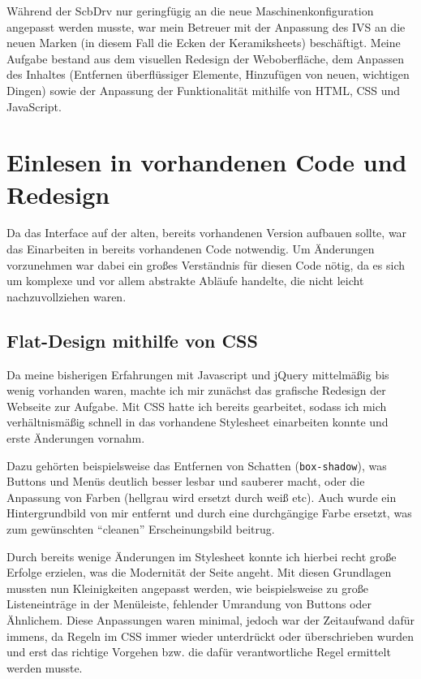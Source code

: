 \documentclass[xcolor=dvipsnames,11pt,paper=a4paper]{report}
\begin{document}
Während der ScbDrv nur geringfügig an die neue Maschinenkonfiguration angepasst
werden musste, war mein Betreuer mit der Anpassung des IVS an die neuen Marken (in
diesem Fall die Ecken der Keramiksheets) beschäftigt. Meine Aufgabe bestand aus
dem visuellen Redesign der Weboberfläche, dem Anpassen des Inhaltes (Entfernen überflüssiger
Elemente, Hinzufügen von neuen, wichtigen Dingen) sowie der Anpassung der Funktionalität
mithilfe von HTML, CSS und JavaScript.



\section{Einlesen in vorhandenen Code und Redesign}
\label{sec:ivs-einlesen}

Da das Interface auf der alten, bereits vorhandenen Version aufbauen sollte, war
das Einarbeiten in bereits vorhandenen Code notwendig. Um Änderungen vorzunehmen
war dabei ein großes Verständnis für diesen Code nötig, da es sich um komplexe und
vor allem abstrakte Abläufe handelte, die nicht leicht nachzuvollziehen waren.


\subsection{Flat-Design mithilfe von CSS}
\label{subsec:ivs-einlesen-css}

Da meine bisherigen Erfahrungen mit Javascript und jQuery mittelmäßig bis wenig
vorhanden waren, machte ich mir zunächst das grafische Redesign der Webseite zur
Aufgabe. Mit CSS hatte ich bereits gearbeitet, sodass ich mich verhältnismäßig schnell
in das vorhandene Stylesheet einarbeiten konnte und erste Änderungen vornahm.

Dazu gehörten beispielsweise das Entfernen von Schatten (\texttt{box-shadow}), was
Buttons und Menüs deutlich besser lesbar und sauberer macht, oder die Anpassung
von Farben (hellgrau wird ersetzt durch weiß etc). Auch wurde ein Hintergrundbild
von mir entfernt und durch eine durchgängige Farbe ersetzt, was zum gewünschten
``cleanen'' Erscheinungsbild beitrug.

Durch bereits wenige Änderungen im Stylesheet konnte ich hierbei recht große Erfolge
erzielen, was die Modernität der Seite angeht. Mit diesen Grundlagen mussten nun
Kleinigkeiten angepasst werden, wie beispielsweise zu große Listeneinträge in der
Menüleiste, fehlender Umrandung von Buttons oder Ähnlichem. Diese Anpassungen waren
minimal, jedoch war der Zeitaufwand dafür immens, da Regeln im CSS immer wieder
unterdrückt oder überschrieben wurden und erst das richtige Vorgehen bzw. die dafür
verantwortliche Regel ermittelt werden musste.
\end{document}
